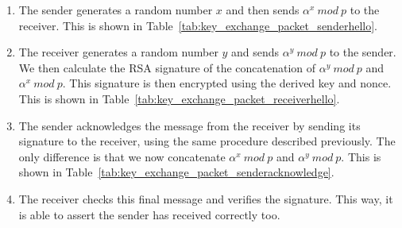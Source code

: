 \documentclass[a4paper]{article}
\begin{document}
\begin{enumerate}
    \item The sender generates a random number $x$ and then sends $\alpha^x\ mod\ p$ to the receiver. This is shown in Table~\ref{tab:key_exchange_packet_senderhello}.
    \item The receiver generates a random number $y$ and sends $\alpha^y\ mod\ p$ to the sender. We then calculate the RSA signature of the concatenation of $\alpha^y\ mod\ p$ and $\alpha^x\ mod\ p$. This signature is then encrypted using the derived key and nonce. This is shown in Table~\ref{tab:key_exchange_packet_receiverhello}.
    \item The sender acknowledges the message from the receiver by sending its signature to the receiver, using the same procedure described previously. The only difference is that we now concatenate $\alpha^x\ mod\ p$ and $\alpha^y\ mod\ p$. This is shown in Table~\ref{tab:key_exchange_packet_senderacknowledge}.
    \item The receiver checks this final message and verifies the signature. This way, it is able to assert the sender has received correctly too.
\end{enumerate}
\end{document}

